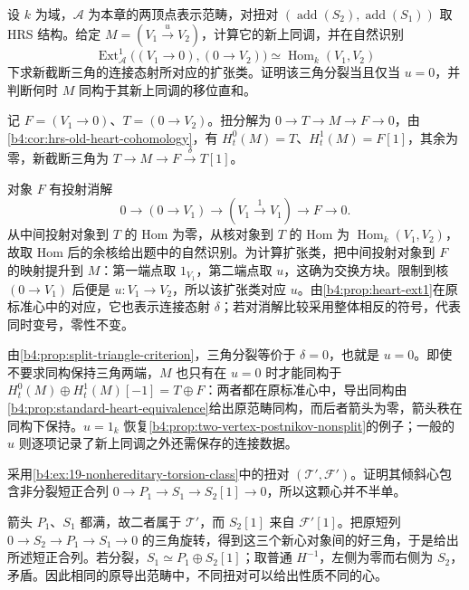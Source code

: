 \begin{exercise}\label{b4:ex:19-projective-new-postnikov}
	设 \(k\) 为域，\(\mathcal A\) 为本章的两顶点表示范畴，对扭对 \((\operatorname{add}(S_2),\operatorname{add}(S_1))\) 取 HRS 结构。给定 \(M=(V_1\xrightarrow{u}V_2)\)，计算它的新上同调，并在自然识别
	\[
		\operatorname{Ext}_{\mathcal A}^1\bigl((V_1\to0),(0\to V_2)\bigr) \simeq\operatorname{Hom}_k(V_1,V_2)
	\]
	下求新截断三角的连接态射所对应的扩张类。证明该三角分裂当且仅当 \(u=0\)，并判断何时 \(M\) 同构于其新上同调的移位直和。
\end{exercise}
\begin{solution}
	记 \(F=(V_1\to0)\)、\(T=(0\to V_2)\)。扭分解为 \(0\to T\to M\to F\to0\)，由\cref{b4:cor:hrs-old-heart-cohomology}，有 \(H_t^0(M)=T\)、\(H_t^1(M)=F[1]\)，其余为零，新截断三角为 \(T\to M\to F\xrightarrow{\delta}T[1]\)。

	对象 \(F\) 有投射消解
	\[
		0\longrightarrow(0\to V_1)\longrightarrow (V_1\xrightarrow{1}V_1)\longrightarrow F\longrightarrow0.
	\]
	从中间投射对象到 \(T\) 的 Hom 为零，从核对象到 \(T\) 的 Hom 为 \(\operatorname{Hom}_k(V_1,V_2)\)，故取 Hom 后的余核给出题中的自然识别。为计算扩张类，把中间投射对象到 \(F\) 的映射提升到 \(M\)：第一端点取 \(1_{V_1}\)，第二端点取 \(u\)，这确为交换方块。限制到核 \((0\to V_1)\) 后便是 \(u:V_1\to V_2\)，所以该扩张类对应 \(u\)。由\cref{b4:prop:heart-ext1}在原标准心中的对应，它也表示连接态射 \(\delta\)；若对消解比较采用整体相反的符号，代表同时变号，零性不变。

	由\cref{b4:prop:split-triangle-criterion}，三角分裂等价于 \(\delta=0\)，也就是 \(u=0\)。即使不要求同构保持三角两端，\(M\) 也只有在 \(u=0\) 时才能同构于 \(H_t^0(M)\oplus H_t^1(M)[-1]=T\oplus F\)：两者都在原标准心中，导出同构由\cref{b4:prop:standard-heart-equivalence}给出原范畴同构，而后者箭头为零，箭头秩在同构下保持。\(u=1_k\) 恢复\cref{b4:prop:two-vertex-postnikov-nonsplit}的例子；一般的 \(u\) 则逐项记录了新上同调之外还需保存的连接数据。
\end{solution}

\begin{exercise}\label{b4:ex:19-other-tilt-nonsplit}
	采用\cref{b4:ex:19-nonhereditary-torsion-class}中的扭对 \((\mathcal T',\mathcal F')\)。证明其倾斜心包含非分裂短正合列 \(0\to P_1\to S_1\to S_2[1]\to0\)，所以这颗心并不半单。
\end{exercise}
\begin{solution}
	箭头 \(P_1\)、\(S_1\) 都满，故二者属于 \(\mathcal T'\)，而 \(S_2[1]\) 来自 \(\mathcal F'[1]\)。把原短列 \(0\to S_2\to P_1\to S_1\to0\) 的三角旋转，得到这三个新心对象间的好三角，于是给出所述短正合列。若分裂，\(S_1\simeq P_1\oplus S_2[1]\)；取普通 \(H^{-1}\)，左侧为零而右侧为 \(S_2\)，矛盾。因此相同的原导出范畴中，不同扭对可以给出性质不同的心。
\end{solution}


